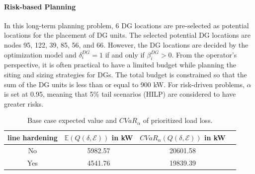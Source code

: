 \paragraph{Risk-based Planning}
In this long-term planning problem, 6 DG locations are pre-selected as potential locations for the placement of DG units. The selected potential DG locations are nodes 95, 122, 39, 85, 56, and 66. However, the DG locations are decided by the optimization model and $\delta_i^{DG} = 1$ if and only if $\beta_i^{DG} > 0$. From the operator's perspective, it is often practical to have a limited budget while planning the siting and sizing strategies for DGs. The total budget is constrained so that the sum of the DG units is less than or equal to 900 kW.  For risk-driven problems, $\alpha$ is set at 0.95, meaning that 5\% tail scenarios (HILP) are considered to have greater risks.

\begin{table}[t]
    \centering
    \caption{Base case expected value and $CVaR_\alpha$ of prioritized load loss.}
    \begin{tabular}{|c|c|c|c|}
    \hline
          line hardening & $\mathbb{E}(Q(\delta, \mathcal{E}))$ in kW & $CVaR_\alpha(Q(\delta, \mathcal{E}))$ in kW \\
    \hline
         No & 5982.57  & 20601.58  \\
    \hline
         Yes & 4541.76  & 19839.39 \\ 
    \hline
    \end{tabular}
    \label{tab:base_case}
\end{table}

